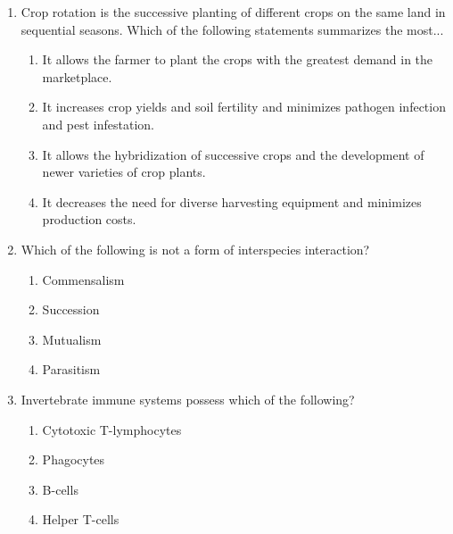 \documentclass[12pt]{article}
\begin{document}
\begin{enumerate}[label=\arabic*.]
\item Crop rotation is the successive planting of different crops on the same land in sequential seasons. Which of the following statements summarizes the most...
\begin{enumerate}[label=(\alph*)]
    \item It allows the farmer to plant the crops with the greatest demand in the marketplace.
    \item It increases crop yields and soil fertility and minimizes pathogen infection and pest infestation.
    \item It allows the hybridization of successive crops and the development of newer varieties of crop plants.
    \item It decreases the need for diverse harvesting equipment and minimizes production costs.
\end{enumerate}
\item Which of the following is not a form of interspecies interaction?
\begin{enumerate}[label=(\alph*)]
    \item Commensalism
    \item Succession
    \item Mutualism
    \item Parasitism
\end{enumerate}
\item Invertebrate immune systems possess which of the following?
\begin{enumerate}[label=(\alph*)]
    \item Cytotoxic T-lymphocytes
    \item Phagocytes
    \item B-cells
    \item Helper T-cells
\end{enumerate}
\end{enumerate}
\end{document}
